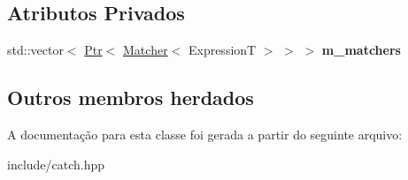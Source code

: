 \subsection*{Atributos Privados}
\begin{DoxyCompactItemize}
\item 
std\+::vector$<$ \hyperlink{classCatch_1_1Ptr}{Ptr}$<$ \hyperlink{structCatch_1_1Matchers_1_1Impl_1_1Matcher}{Matcher}$<$ ExpressionT $>$ $>$ $>$ {\bfseries m\+\_\+matchers}\hypertarget{classCatch_1_1Matchers_1_1Impl_1_1Generic_1_1AnyOf_a35057f1720c23b74c1b7b62acb62be7d}{}\label{classCatch_1_1Matchers_1_1Impl_1_1Generic_1_1AnyOf_a35057f1720c23b74c1b7b62acb62be7d}

\end{DoxyCompactItemize}
\subsection*{Outros membros herdados}


A documentação para esta classe foi gerada a partir do seguinte arquivo\+:\begin{DoxyCompactItemize}
\item 
include/catch.\+hpp\end{DoxyCompactItemize}
